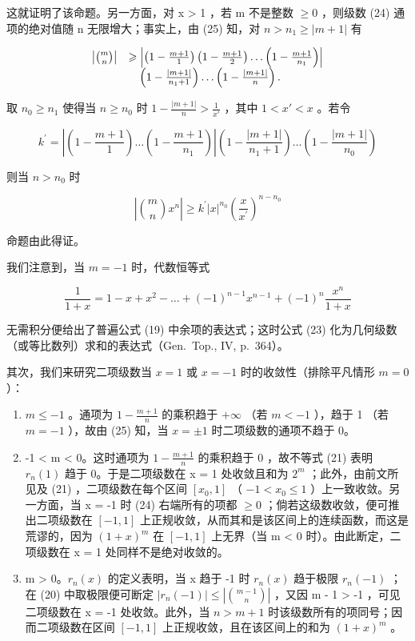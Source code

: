 这就证明了该命题。另一方面，对 x \textgreater{} 1 ，若 m 不是整数 \(\geqslant 0\) ，则级数 (24) 通项的绝对值随 n 无限增大；事实上，由 (25) 知，对 \(n > n_{1} \geqslant |m + 1|\) 有

\[
\begin{array}{r l} \left| \binom {m} {n} \right| & \geqslant \left| \left(1 - \frac {m + 1}{1}\right) \left(1 - \frac {m + 1}{2}\right) \dots \left(1 - \frac {m + 1}{n _ {1}}\right) \right| \\ & \quad \left(1 - \frac {| m + 1 |}{n _ {1} + 1}\right) \dots \left(1 - \frac {| m + 1 |}{n}\right). \end{array}
\]

取 \(n_0 \geqslant n_1\) 使得当 \(n \geqslant n_0\) 时 \(1 - \frac{|m + 1|}{n} > \frac{1}{x'}\) ，其中 \(1 < x' < x\) 。若令

\[
k ^ {\prime} = \left| \left(1 - \frac {m + 1}{1}\right) \dots \left(1 - \frac {m + 1}{n _ {1}}\right) \right| \left(1 - \frac {| m + 1 |}{n _ {1} + 1}\right) \dots \left(1 - \frac {| m + 1 |}{n _ {0}}\right)
\]

则当 \(n > n_0\) 时

\[
\left| \binom {m} {n} x ^ {n} \right| \geqslant k ^ {\prime} | x | ^ {n _ {0}} \left(\frac {x}{x ^ {\prime}}\right) ^ {n - n _ {0}}
\]

命题由此得证。

我们注意到，当 \(m = -1\) 时，代数恒等式

\[
\frac {1}{1 + x} = 1 - x + x ^ {2} - \dots + (- 1) ^ {n - 1} x ^ {n - 1} + (- 1) ^ {n} \frac {x ^ {n}}{1 + x}\tag{26}
\]

无需积分便给出了普遍公式 (19) 中余项的表达式；这时公式 (23) 化为几何级数（或等比数列）求和的表达式（Gen.~Top., IV, p.~364）。

其次，我们来研究二项级数当 \(x = 1\) 或 \(x = -1\) 时的收敛性（排除平凡情形 \(m = 0\) ）：

\begin{enumerate}
\def\labelenumi{\alph{enumi})}
\item
  \(m \leqslant -1\) 。通项为 \(1 - \frac{m + 1}{n}\) 的乘积趋于 \(+\infty\) （若 \(m < -1\) ），趋于 1 （若 \(m = -1\) ），故由 (25) 知，当 \(x = \pm 1\) 时二项级数的通项不趋于 0。
\item
  -1 \textless{} m \textless{} 0。这时通项为 \(1 - \frac{m + 1}{n}\) 的乘积趋于 0 ，故不等式 (21) 表明 \(r_{n}(1)\) 趋于 0。于是二项级数在 x = 1 处收敛且和为 \(2^{m}\) ；此外，由前文所见及 (21) ，二项级数在每个区间 \([x_{0}, 1]\) （ \(-1 < x_{0} \leqslant 1\) ）上一致收敛。另一方面，当 x = -1 时 (24) 右端所有的项都 \(\geqslant 0\) ；倘若这级数收敛，便可推出二项级数在 \([-1, 1]\) 上正规收敛，从而其和是该区间上的连续函数，而这是荒谬的，因为 \((1 + x)^{m}\) 在 \([-1, 1]\) 上无界（当 m \textless{} 0 时）。由此断定，二项级数在 x = 1 处同样不是绝对收敛的。
\item
  m \textgreater{} 0。\(r_{n}(x)\) 的定义表明，当 x 趋于 -1 时 \(r_{n}(x)\) 趋于极限 \(r_{n}(-1)\) ；在 (20) 中取极限便可断定 \(|r_{n}(-1)| \leqslant \left|\binom{m-1}{n}\right|\) ，又因 m - 1 \textgreater{} -1 ，可见二项级数在 x = -1 处收敛。此外，当 \(n > m + 1\) 时该级数所有的项同号；因而二项级数在区间 \([-1, 1]\) 上正规收敛，且在该区间上的和为 \((1 + x)^{m}\) 。
\end{enumerate}

